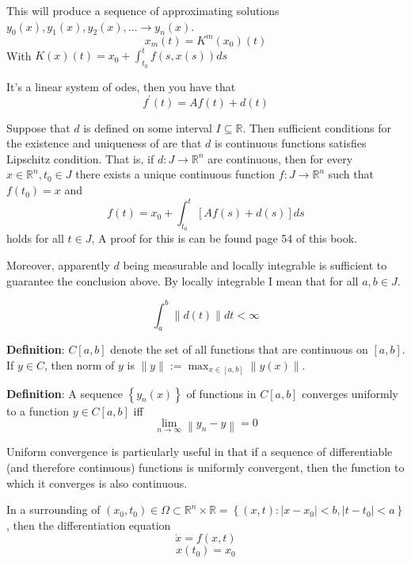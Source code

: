 \documentclass[a4paper]{article}
\begin{document}
This will produce a sequence of approximating solutions $y_{0}(x), y_{1}(x), y_{2}(x), \ldots \rightarrow y_{n}(x)$.
$$x_{m}(t)=K^{m}\left(x_{0}\right)(t)$$
With $K(x)(t)=x_{0}+\int_{t_{0}}^{t} f(s, x(s)) d s$

It's a linear system of odes, then you have that
$$
f^{\prime}(t)=A f(t)+d(t)
$$

Suppose that $d$ is defined on some interval $I \subseteq \mathbb{R}$. Then sufficient conditions for the existence and uniqueness of are that $d$ is continuous functions satisfies Lipschitz condition. That is, if $d: J \rightarrow \mathbb{R}^{n}$ are continuous, then for every $x \in \mathbb{R}^{n}, t_{0} \in J$ there exists a unique continuous function $f: J \rightarrow \mathbb{R}^{n}$ such that $f\left(t_{0}\right)=x$ and
$$
f(t)=x_{0}+\int_{t_{0}}^{t}[A f(s)+d(s)] d s
$$
holds for all $t \in J$, A proof for this is can be found page 54 of this book.

Moreover, apparently $d$ being measurable and locally integrable is sufficient to guarantee the conclusion above. By locally integrable I mean that for all $a, b \in J$.

$$
\int_{a}^{b}\|d(t)\| d t<\infty
$$

\textbf{Definition}: $C[a, b]$ denote the set of all functions that are continuous on $[a, b]$. If $y \in C$, then norm of $y$ is $\|y\|:=\max _{x \in[a, b]}\|y(x)\|$.

\textbf{Definition}: A sequence $\left\{y_{n}(x)\right\}$ of functions in $C[a, b]$ converges uniformly to a function $y \in C[a, b]$ iff
$$\lim _{n \rightarrow \infty}\left\|y_{n}-y\right\|=0$$

Uniform convergence is particularly useful in that if a sequence of differentiable (and therefore continuous) functions is uniformly convergent, then the function to which it converges is also continuous.

In a surrounding of $\left(x_{0}, t_{0}\right) \in \Omega \subset \mathbb{R}^{n} \times \mathbb{R}=\left\{(x, t):\left|x-x_{0}\right|<b,\left|t-t_{0}\right|<a\right\}$, then the differentiation equation
$$\dot{x}=f(x, t)$$
$$x\left(t_{0}\right)=x_{0}$$
\end{document}

